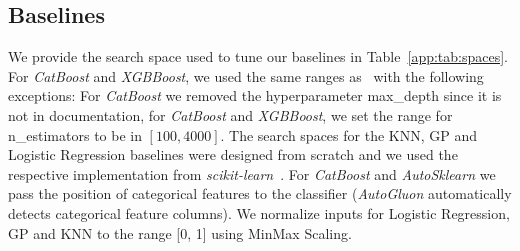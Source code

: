\documentclass{article}
\begin{document}
\subsection{Baselines}\label{app:ssec:spaces}
We provide the search space used to tune our baselines in Table~\ref{app:tab:spaces}. For \textit{CatBoost} and \textit{XGBBoost}, we used the same ranges as~\citet{nnsfortabular2} with the following exceptions: For \textit{CatBoost} we removed the hyperparameter max\_depth since it is not in documentation, for \textit{CatBoost} and \textit{XGBBoost}, we set the range for n\_estimators to be in $[100, 4000]$. The search spaces for the KNN, GP and Logistic Regression baselines were designed from scratch and we used the respective implementation from \textit{scikit-learn}~\citep{scikit-learn}. For \textit{CatBoost} and \textit{AutoSklearn} we pass the position of categorical features to the classifier (\textit{AutoGluon} automatically detects categorical feature columns). We normalize inputs for Logistic Regression, GP and KNN to the range [0, 1] using MinMax Scaling.
\end{document}
